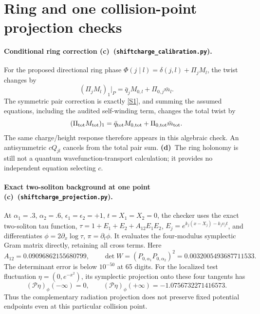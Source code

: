 \documentclass[11pt,a4paper]{article}
\newcommand{\C}{\textbf{(c)}\ }
\newcommand{\D}{\textbf{(d)}\ }
\newcommand{\file}[1]{\nolinkurl{#1}}
\newcommand{\calcheck}{\file{shiftcharge_calibration.py}}
\newcommand{\proj}{\file{shiftcharge_projection.py}}
\begin{document}
\section{Ring and one collision-point projection checks}
\paragraph{Conditional ring correction \C (\calcheck).}
For the proposed directional ring phase $\Phi(j\mid l)=\delta(j,l)+\Pi_jM_l$,
the twist changes by
\begin{equation}
 (\Pi_jM_l)_1|_P=\bar q_jM_{0,l}+\Pi_{0,j}\bar m_l.
\end{equation}
The symmetric pair correction is exactly \eqref{S1}, and summing the
assumed equations, including the audited self-winding term, changes the
total twist by
\begin{equation}
 (\Pi_{\rm tot}M_{\rm tot})_1
       =\bar q_{\rm tot}M_{0,\rm tot}+\Pi_{0,\rm tot}\bar m_{\rm tot}.
\end{equation}
The same charge/height response therefore appears in this algebraic check.
An antisymmetric $cQ_{jl}$ cancels from the total pair sum. \D The ring
holonomy is still not a quantum wavefunction-transport calculation; it
provides no independent equation selecting $c$.

\paragraph{Exact two-soliton background at one point \C (\proj).}
At $\alpha_1=.3$, $\alpha_2=.6$, $\epsilon_1=\epsilon_2=+1$,
$t=X_1=X_2=0$, the checker uses the exact two-soliton tau function,
$\tau=1+E_1+E_2+A_{12}E_1E_2$, $E_j=e^{k_j(x-X_j)-k_jv_jt}$,
and differentiates $\phi=2\partial_x\log\tau$, $\pi=\partial_t\phi$.
It evaluates the four-modulus symplectic Gram matrix directly, retaining
all cross terms. Here
\begin{equation}
 A_{12}=0.09096862155680799,\qquad
 \det W=(P_{0,\alpha_1}P_{0,\alpha_2})^2
          =0.0032005493687711533.
\end{equation}
The determinant error is below $10^{-50}$ at 65 digits. For the localized
test fluctuation $\eta=(0,e^{-x^2})$, its symplectic projection onto these
four tangents has
\begin{equation}
 (\mathcal P\eta)_\phi(-\infty)=0,\qquad
 (\mathcal P\eta)_\phi(+\infty)=-1.0756732271416573.
\end{equation}
Thus the complementary radiation projection does not preserve fixed
potential endpoints even at this particular collision point.
\end{document}
